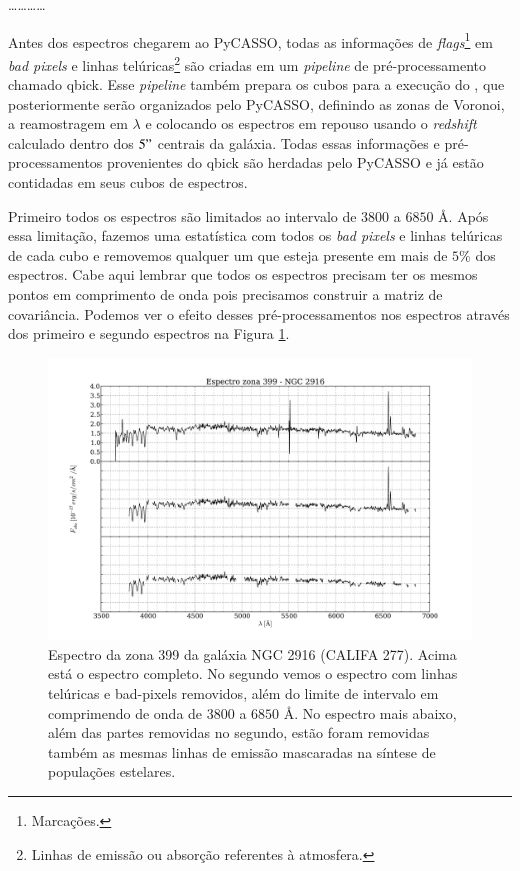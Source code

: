 \ldots \dots \ldots \ldots
                                                                                                                                                                                                                                                                               
Antes dos espectros chegarem ao PyCASSO, todas as informações de {\em flags}\footnote{Marcações.} em {\em bad pixels} e
linhas telúricas\footnote{Linhas de emissão ou absorção referentes à atmosfera.} são criadas em um {\em pipeline} de
pré-processamento chamado {\sc qbick}. Esse {\em pipeline} também prepara os cubos para a execução do \starlight, que
posteriormente serão organizados pelo PyCASSO, definindo as zonas de Voronoi, a reamostragem em $\lambda$ e colocando os
espectros em repouso usando o {\em redshift} calculado dentro dos $5"$ centrais da galáxia. Todas essas informações e
pré-processamentos provenientes do {\sc qbick} são herdadas pelo PyCASSO e já estão contidadas em seus cubos de
espectros.

Primeiro todos os espectros são limitados ao intervalo de $3800$ a $6850$ \AA. Após essa limitação, fazemos uma
estatística com todos os {\em bad pixels} e linhas telúricas de cada cubo e removemos qualquer um que esteja presente em
mais de $5\%$ dos espectros. Cabe aqui lembrar que todos os espectros precisam ter os mesmos pontos em comprimento de
onda pois precisamos construir a matriz de covariância. Podemos ver o efeito desses pré-processamentos nos espectros
através dos primeiro e segundo espectros na Figura \ref{fig:cap4:checkmask}.

\begin{figure}
    \includegraphics[width=1.0\textwidth]{figuras/K0277-constant_inital_mask-399.pdf}
    \caption[Exemplo de máscaras em um espectro do cubo de dados.]
    {Espectro da zona 399 da galáxia NGC 2916 (CALIFA 277). Acima está o espectro completo. No segundo vemos o espectro
    com linhas telúricas e bad-pixels removidos, além do limite de intervalo em comprimendo de onda de $3800$ a $6850$
    \AA. No espectro mais abaixo, além das partes removidas no segundo, estão foram removidas também as mesmas linhas de
    emissão mascaradas na síntese de populações estelares.}
    \label{fig:cap4:checkmask}
\end{figure}

